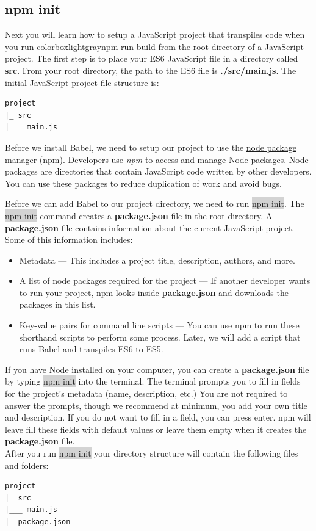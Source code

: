 \documentclass[11pt]{article}
\begin{document}
\subsection{npm init}
Next you will learn how to setup a JavaScript project that transpiles code when you run colorbox{lightgray}{npm run build} from the root directory of a JavaScript project. The first step is to place your ES6 JavaScript file in a directory called \textbf{src}. From your root directory, the path to the ES6 file is \textbf{./src/main.js}. The initial JavaScript project file structure is:
\begin{lstlisting}[basicstyle=\small\ttfamily\color{theWhite}, backgroundcolor = \color{theBlack}, language = Comment]
project
|_ src
|___ main.js
\end{lstlisting}
Before we install Babel, we need to setup our project to use the \href{https://docs.npmjs.com/about-npm/index.html}{node package manager (npm)}. Developers use \textit{npm} to access and manage Node packages. Node packages are directories that contain JavaScript code written by other developers. You can use these packages to reduce duplication of work and avoid bugs.

Before we can add Babel to our project directory, we need to run \colorbox{lightgray}{npm init}. The \colorbox{lightgray}{npm init} command creates a \textbf{package.json} file in the root directory. A \textbf{package.json} file contains information about the current JavaScript project. Some of this information includes:
\begin{itemize}[leftmargin = *]
\item Metadata — This includes a project title, description, authors, and more.
\item A list of node packages required for the project — If another developer wants to run your project, npm looks inside \textbf{package.json} and downloads the packages in this list.
\item Key-value pairs for command line scripts — You can use npm to run these shorthand scripts to perform some process. Later, we will add a script that runs Babel and transpiles ES6 to ES5.
\end{itemize}
If you have Node installed on your computer, you can create a \textbf{package.json} file by typing \colorbox{lightgray}{npm init} into the terminal. The terminal prompts you to fill in fields for the project’s metadata (name, description, etc.) You are not required to answer the prompts, though we recommend at minimum, you add your own title and description. If you do not want to fill in a field, you can press enter. npm will leave fill these fields with default values or leave them empty when it creates the \textbf{package.json} file. \\
\newline
After you run \colorbox{lightgray}{npm init} your directory structure will contain the following files and folders:
\begin{lstlisting}[basicstyle=\small\ttfamily\color{theWhite}, backgroundcolor = \color{theBlack}, language = Comment]
project
|_ src
|___ main.js
|_ package.json
\end{lstlisting}
\end{document}
